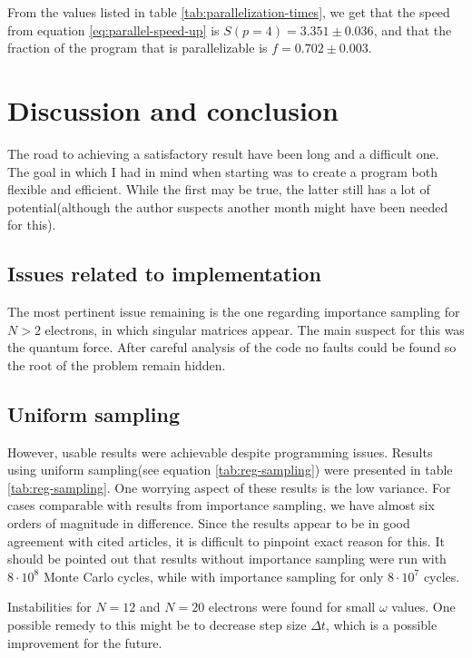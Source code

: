 \documentclass[11pt]{article}
\begin{document}
From the values listed in table \ref{tab:parallelization-times}, we get that the speed from equation \eqref{eq:parallel-speed-up} is $S(p=4) = 3.351 \pm 0.036$, and that the fraction of the program that is parallelizable is $f = 0.702 \pm 0.003$.




\section{Discussion and conclusion}
The road to achieving a satisfactory result have been long and a difficult one. The goal in which I had in mind when starting was to create a program both flexible and efficient. While the first may be true, the latter still has a lot of potential(although the author suspects another month might have been needed for this). 

\subsection{Issues related to implementation}
The most pertinent issue remaining is the one regarding importance sampling for $N > 2$ electrons, in which singular matrices appear. The main suspect for this was the quantum force. After careful analysis of the code no faults could be found so the root of the problem remain hidden.

\subsection{Uniform sampling}
However, usable results were achievable despite programming issues. Results using uniform sampling(see equation \eqref{tab:reg-sampling}) were presented in table \ref{tab:reg-sampling}. One worrying aspect of these results is the low variance. For cases comparable with results from importance sampling, we have almost six orders of magnitude in difference. Since the results appear to be in good agreement with cited articles, it is difficult to pinpoint exact reason for this. It should be pointed out that results without importance sampling were run with $8\cdot 10^8$ Monte Carlo cycles, while with importance sampling for only $8\cdot 10^7$ cycles. 

Instabilities for $N=12$ and $N=20$ electrons were found for small $\omega$ values. One possible remedy to this might be to decrease step size $\Delta t$, which is a possible improvement for the future.
\end{document}
